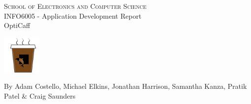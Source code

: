 \begin{titlepage}
	
\begin{center}

\textsc{\huge{School of Electronics and Computer Science}}\\[2cm]

\huge{INFO6005 - Application Development Report}\\[5cm]

\LARGE{OptiCaff}

\begin{center}
\includegraphics[trim = 0mm 0mm 0mm 0mm, clip, scale=1.5]{Images/ic_launcher.png}
\end{center}

\vfill 

\LARGE{By Adam Costello, Michael Elkins, Jonathan Harrison, Samantha Kanza, Pratik Patel $\&$ Craig Saunders}

\end{center}

\end{titlepage}
